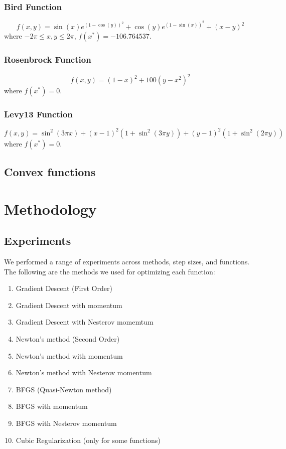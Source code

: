 \documentclass{article}
\begin{document}
\subsubsection{Bird Function}
\begin{equation}
f(x,y) = \sin(x)e^{(1-\cos(y))^2} + \cos(y)e^{(1-\sin(x))^2} + (x-y)^2
\end{equation}
where $-2\pi \le x,y \le 2\pi$, $f(x^*)=-106.764537$.

\subsubsection{Rosenbrock Function}
\begin{equation}
f(x,y) = (1-x)^2 + 100(y-x^2)^2
\end{equation}
where $f(x^*)=0$.

\subsubsection{Levy13 Function}
\begin{equation}
f(x,y) = \sin^2(3\pi x) + (x-1)^2\left(1+\sin^2(3\pi y)\right) + (y-1)^2\left(1+\sin^2(2\pi y)\right)
\end{equation}
where $f(x^*)=0$.

\subsection{Convex functions}




\section{Methodology}\label{experiments}

\subsection{Experiments}
We performed a range of experiments across methods, step sizes, and functions. The following are the methods we used for optimizing each function:
\begin{enumerate}
	\item Gradient Descent (First Order)
	\item Gradient Descent with momentum
	\item Gradient Descent with Nesterov momemtum
	\item Newton's method (Second Order)
	\item Newton's method with momentum 
	\item Newton's method with Nesterov momentum
	\item BFGS (Quasi-Newton method)
	\item BFGS with momentum
	\item BFGS with Nesterov momentum
	\item Cubic Regularization (only for some functions)
\end{enumerate}
\end{document}
